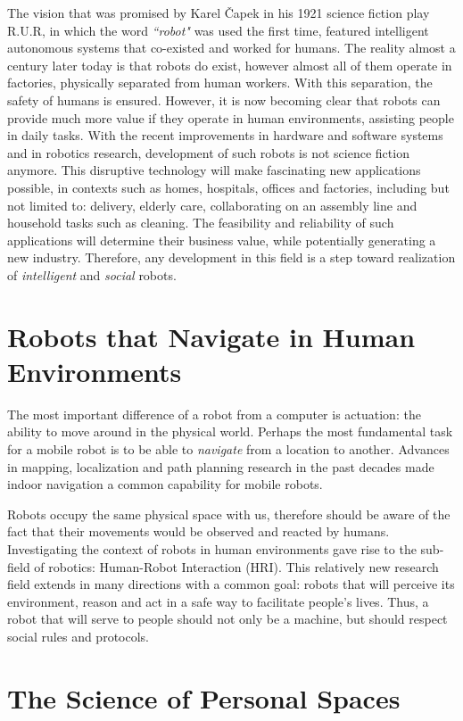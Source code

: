 \documentclass[12pt]{gatech-thesis}
\begin{document}
The vision that was promised by Karel \v{C}apek in his 1921 science fiction play R.U.R, in which the word \textit{``robot"} was used the first time, featured intelligent autonomous systems that co-existed and worked for humans. The reality almost a century later today is that robots do exist, however almost all of them operate in factories, physically separated from human workers. With this separation, the safety of humans is ensured. However, it is now becoming clear that robots can provide much more value if they operate in human environments, assisting people in daily tasks. With the recent improvements in hardware and software systems and in robotics research, development of such robots is not science fiction anymore. This disruptive technology will make fascinating new applications possible, in contexts such as homes, hospitals, offices and factories, including but not limited to: delivery, elderly care, collaborating on an assembly line and household tasks such as cleaning. The feasibility and reliability of such applications will determine their business value, while potentially generating a new industry. Therefore, any development in this field is a step toward realization of \textit{intelligent} and \textit{social} robots.

\section{Robots that Navigate in Human Environments}

The most important difference of a robot from a computer is actuation: the ability to move around in the physical world. Perhaps the most fundamental task for a mobile robot is to be able to \textit{navigate} from a location to another. Advances in mapping, localization and path planning research in the past decades made indoor navigation a common capability for mobile robots. 

Robots occupy the same physical space with us, therefore should be aware of the fact that their movements would be observed and reacted by humans. Investigating the context of robots in human environments gave rise to the sub-field of robotics: Human-Robot Interaction (HRI). This relatively new research field extends in many directions with a common goal: robots that will perceive its environment, reason and act in a safe way to facilitate people's lives. Thus, a robot that will serve to people should not only be a machine, but should respect social rules and protocols.

\section{The Science of Personal Spaces}
\label{sec:personal_spaces}
\end{document}
